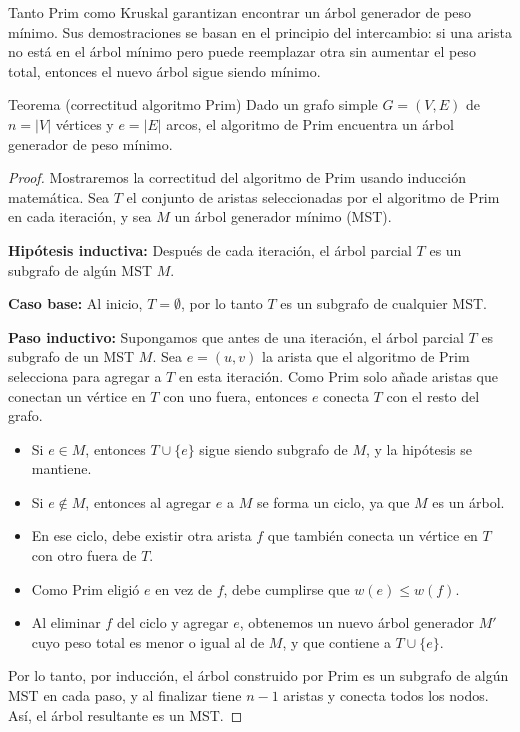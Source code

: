 Tanto Prim como Kruskal garantizan encontrar un árbol generador de peso mínimo. Sus demostraciones se basan en el principio del intercambio: si una arista no está en el árbol mínimo pero puede reemplazar otra sin aumentar el peso total, entonces el nuevo árbol sigue siendo mínimo.



\begin{thmblock}{Teorema (correctitud algoritmo Prim)}
 Dado un grafo simple $G=(V,E)$ de $n=|V|$ vértices y $e=|E|$ arcos, 
  el algoritmo de Prim encuentra un árbol generador de peso mínimo.
\end{thmblock}
\begin{proof}
Mostraremos la correctitud del algoritmo de Prim usando inducción matemática. Sea $T$ el conjunto de aristas seleccionadas por el algoritmo de Prim en cada iteración, y sea $M$ un árbol generador mínimo (MST).

\textbf{Hipótesis inductiva:} Después de cada iteración, el árbol parcial $T$ es un subgrafo de algún MST $M$.

\textbf{Caso base:} Al inicio, $T = \emptyset$, por lo tanto $T$ es un subgrafo de cualquier MST.

\textbf{Paso inductivo:} Supongamos que antes de una iteración, el árbol parcial $T$ es subgrafo de un MST $M$. Sea $e = (u,v)$ la arista que el algoritmo de Prim selecciona para agregar a $T$ en esta iteración. Como Prim solo añade aristas que conectan un vértice en $T$ con uno fuera, entonces $e$ conecta $T$ con el resto del grafo.

\begin{itemize}
  \item Si $e \in M$, entonces $T \cup \{e\}$ sigue siendo subgrafo de $M$, y la hipótesis se mantiene.
  \item Si $e \notin M$, entonces al agregar $e$ a $M$ se forma un ciclo, ya que $M$ es un árbol.
  \item En ese ciclo, debe existir otra arista $f$ que también conecta un vértice en $T$ con otro fuera de $T$.
  \item Como Prim eligió $e$ en vez de $f$, debe cumplirse que $w(e) \leq w(f)$.
  \item Al eliminar $f$ del ciclo y agregar $e$, obtenemos un nuevo árbol generador $M'$ cuyo peso total es menor o igual al de $M$, y que contiene a $T \cup \{e\}$.
\end{itemize}

Por lo tanto, por inducción, el árbol construido por Prim es un subgrafo de algún MST en cada paso, y al finalizar tiene $n-1$ aristas y conecta todos los nodos. Así, el árbol resultante es un MST.

\end{proof}



